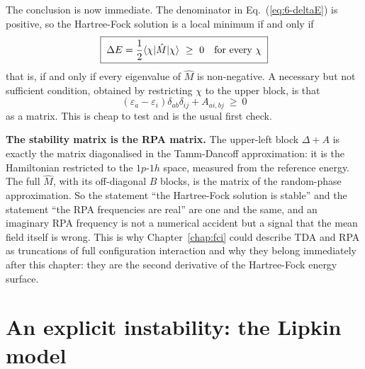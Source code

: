 The conclusion is now immediate.  The denominator in
Eq.~(\ref{eq:6-deltaE}) is positive, so the Hartree-Fock solution is a local
minimum if and only if
\begin{equation}
  \boxed{\;
  \Delta E = \frac{1}{2}\langle \chi | \hat{M} | \chi \rangle \ \ge\ 0
  \quad\text{for every }\chi
  \;}
  \label{eq:6-stabilitycriterion}
\end{equation}
that is, if and only if every eigenvalue of $\hat{M}$ is non-negative.  A
necessary but not sufficient condition, obtained by restricting $\chi$ to the
upper block, is that
\begin{equation}
  \left(\varepsilon_a-\varepsilon_i\right)\delta_{ab}\delta_{ij}
  + A_{ai,bj} \ \ge\ 0
  \label{eq:6-necessary}
\end{equation}
as a matrix.  This is cheap to test and is the usual first check.

\begin{notebox}
\textbf{The stability matrix is the RPA matrix.}  The upper-left block
$\Delta+A$ is exactly the matrix diagonalised in the Tamm-Dancoff
approximation: it is the Hamiltonian restricted to the $1p$-$1h$ space,
measured from the reference energy.  The full $\hat{M}$, with its off-diagonal
$B$ blocks, is the matrix of the random-phase approximation.  So the statement
``the Hartree-Fock solution is stable'' and the statement ``the RPA
frequencies are real'' are one and the same, and an imaginary RPA frequency is
not a numerical accident but a signal that the mean field itself is wrong.
This is why Chapter~\ref{chap:fci} could describe TDA and RPA as truncations
of full configuration interaction and why they belong immediately after this
chapter: they are the second derivative of the Hartree-Fock energy surface.
\end{notebox}

\section{An explicit instability: the Lipkin model}
\label{sec:lipkininstability}

